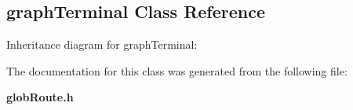 \subsection{graph\-Terminal  Class Reference}
\label{graphTerminal}
Inheritance diagram for graph\-Terminal:\begin{figure}[H]
\begin{center}
\leavevmode
\setlength{\epsfysize}{2cm}
\end{center}
\end{figure}


The documentation for this class was generated from the following file:\begin{CompactItemize}
\item 
{\bf glob\-Route.h}\end{CompactItemize}
